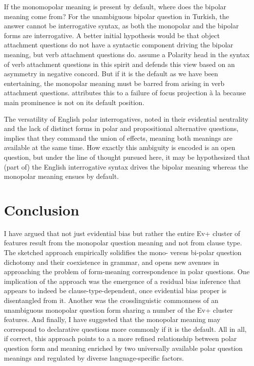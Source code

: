\documentclass[output=paper,colorlinks,citecolor=brown]{langscibook}
\begin{document}
If the monomopolar meaning is present by default, where does the bipolar meaning come from? For the unambiguous bipolar question in Turkish, the answer cannot be interrogative syntax, as both the monopolar and the bipolar forms are interrogative. A better initial hypothesis would be that object attachment questions do not have a syntactic component driving the bipolar meaning, but verb attachment questions do. \citet{kamali-krifka} assume a Polarity head in the syntax of verb attachment questions in this spirit and \citet{bimono} defends this view based on an asymmetry in negative concord. But if it is the default as we have been entertaining, the monopolar meaning must be barred from arising in verb attachment questions. \citet{bimono} attributes this to a failure of focus projection \`a la \citet{selkirk95} because main prominence is not on its default position.  

The versatility of English polar interrogatives, noted in their evidential neutrality and the lack of distinct forms in polar and propositional alternative questions, implies that they command the union of effects, meaning both meanings are available at the same time. How exactly this ambiguity is encoded is an open question, but under the line of thought pursued here, it may be hypothesized that (part of) the English interrogative syntax drives the bipolar meaning whereas the monopolar meaning ensues by default. 

\section{Conclusion}\label{sec:11:7}
\largerpage
I have argued that not just evidential bias but rather the entire Ev+ cluster of features result from the monopolar question meaning and not from clause type. The sketched approach empirically solidifies the mono- versus bi-polar question dichotomy and their coexistence in grammar, and opens new avenues in approaching the problem of form-meaning correspondence in polar questions. One implication of the approach was the emergence of a residual bias inference that appears to indeed be clause-type-dependent, once evidential bias proper is disentangled from it. Another was the crosslinguistic commonness of an unambiguous monopolar question form sharing a number of the Ev+ cluster features. And finally, I have suggested that the monopolar meaning may correspond to declarative questions more commonly if it is the default. All in all, if correct, this approach points to a a more refined relationship between polar question form and meaning enriched by two universally available polar question meanings and regulated by diverse language-specific factors. 
  
\end{document}
